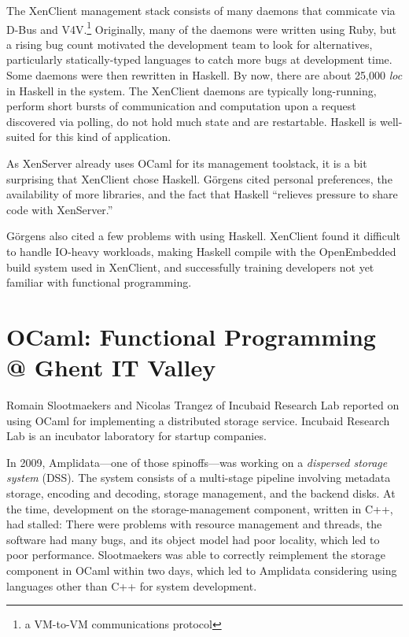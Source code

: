 \documentclass{jfp1}
\begin{document}
The XenClient management stack consists of many daemons that commicate
via D-Bus and V4V.\footnote{a VM-to-VM communications protocol}  Originally,
many of the daemons were written using Ruby, but a rising bug count
motivated the development team to look for alternatives, particularly
statically-typed languages to catch more bugs at development time.
Some daemons were then rewritten in Haskell.  By now, there are about
25,000 {\em loc} in Haskell in the system.  The XenClient daemons are
typically long-running, perform short bursts of communication and
computation upon a request discovered via polling, do not hold much
state and are restartable.  Haskell is well-suited for this kind of
application.

As XenServer already uses OCaml for its management toolstack, it is a
bit surprising that XenClient chose Haskell.  Görgens cited personal
preferences, the availability of more libraries, and the fact that
Haskell ``relieves pressure to share code with XenServer.''

Görgens also cited a few problems with using Haskell.  XenClient found
it difficult to handle IO-heavy workloads, making Haskell compile with
the OpenEmbedded build system used in XenClient, and
successfully training developers not yet familiar with functional
programming.

\section{OCaml: Functional Programming @ Ghent IT Valley}

Romain Slootmaekers and Nicolas Trangez of Incubaid Research Lab
reported on using OCaml for implementing a distributed storage
service.  Incubaid Research Lab is an incubator laboratory for startup
companies.

In 2009, Amplidata---one of those spinoffs---was working on a
\textit{dispersed storage system} (DSS).  The system consists of a
multi-stage pipeline involving metadata storage, encoding and
decoding, storage management, and the backend disks.  At the time,
development on the storage-management component, written in C++, had
stalled: There were problems with resource management and threads, the
software had many bugs, and its object model had poor locality, which
led to poor performance.  Slootmaekers was able to correctly
reimplement the storage component in OCaml within two days, which led
to Amplidata considering using languages other than C++ for system
development.
\end{document}
